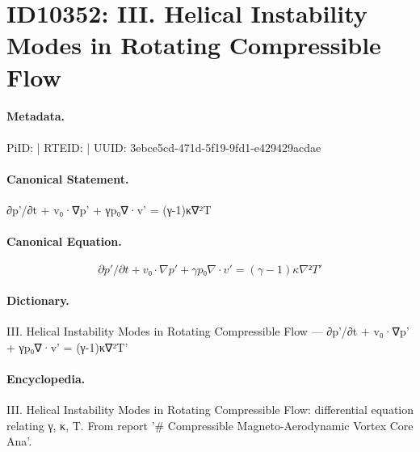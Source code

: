 \section*{ID10352: III. Helical Instability Modes in Rotating Compressible Flow}
\paragraph{Metadata.}
PiID:  | RTEID:  | UUID: 3ebce5cd-471d-5f19-9fd1-e429429acdae

\paragraph{Canonical Statement.}
∂p'/∂t + v₀·∇p' + γp₀∇·v' = (γ-1)κ∇²T

\paragraph{Canonical Equation.}
\[
∂p'/∂t + v₀·∇p' + γp₀∇·v' = (γ-1)κ∇²T'
\]

\paragraph{Dictionary.}
III. Helical Instability Modes in Rotating Compressible Flow — ∂p'/∂t + v₀·∇p' + γp₀∇·v' = (γ-1)κ∇²T'

\paragraph{Encyclopedia.}
III. Helical Instability Modes in Rotating Compressible Flow: differential equation relating γ, κ, T. From report '\# Compressible Magneto-Aerodynamic Vortex Core Ana'.
